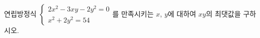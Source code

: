 연립방정식 $\begin{cases} 2x^2-3xy-2y^2=0 \\ x^2+2y^2=54 \end{cases}$를 만족시키는 $x$, $y$에 대하여 $xy$의 최댓값을 구하시오.
